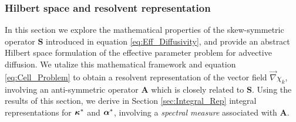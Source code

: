 \documentclass[11pt]{amsart}
\newcommand{\Sb}{\mathbf{S}}
\newcommand{\Ab}{\mathbf{A}}
\newcommand\balpha{\mbox{\boldmath${\alpha}$}}
\newcommand\bkappa{\mbox{\boldmath${\kappa}$}}
\begin{document}
\subsubsection{Hilbert space and resolvent
  representation} \label{sec:Hilbert_Space}   
%
In this section we explore the mathematical properties of the
skew-symmetric operator $\Sb$ introduced in equation
\eqref{eq:Eff_Diffusivity}, and provide an abstract Hilbert space
formulation of the effective parameter problem for advective
diffusion. We utalize this mathematical framework and equation
\eqref{eq:Cell_Problem}  to obtain a resolvent representation of the
vector field $\vec{\nabla}\chi_k$, involving an anti-symmetric operator $\Ab$
which is closely related to $\Sb$. Using the results of this section,
we derive in Section \ref{sec:Integral_Rep} integral representations
for $\bkappa^*$ and $\balpha^*$, involving a \emph{spectral measure}
associated with $\Ab$.       
\end{document}
